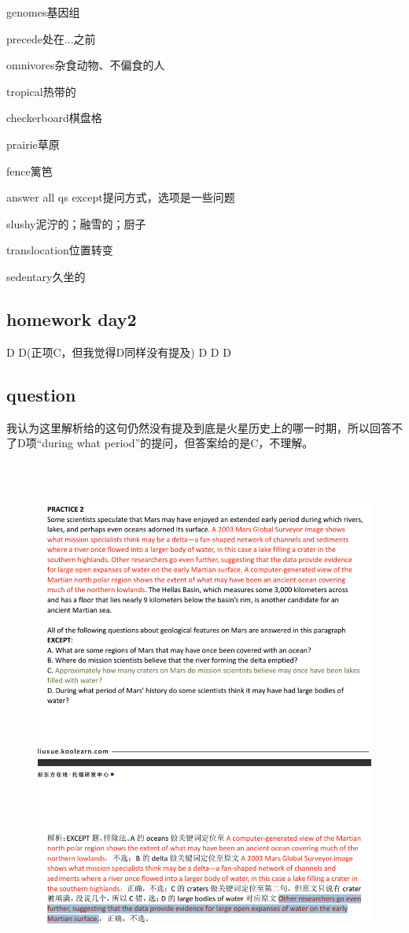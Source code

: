 \documentclass[a4paper, 10pt]{article}
\begin{document}
genomes基因组

precede处在...之前

omnivores杂食动物、不偏食的人

tropical热带的


checkerboard棋盘格

prairie草原

fence篱笆

answer all qs except提问方式，选项是一些问题


slushy泥泞的；融雪的；厨子

translocation位置转变

sedentary久坐的

\subsection{homework day2}

D  D(正项C，但我觉得D同样没有提及)  D  D  D

\subsection{question}
我认为这里解析给的这句仍然没有提及到底是火星历史上的哪一时期，所以回答不了D项“during what period”的提问，但答案给的是C，不理解。

\begin{figure}[ht]
    \centering 
    \includegraphics[height=17cm,width=14.5cm]{pic8.png}
    
    
    \label{2}
    
\end{figure}
\end{document}

